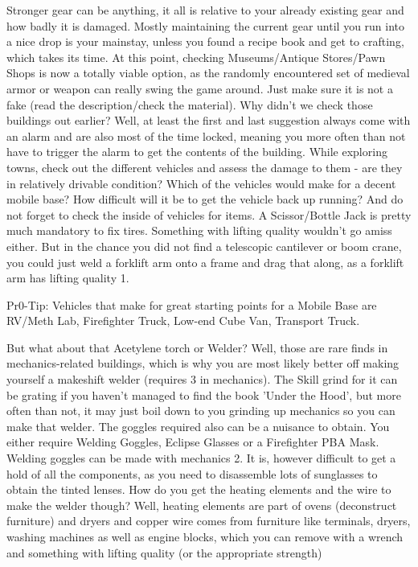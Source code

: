 \documentclass[11pt]{report}
\begin{document}
Stronger gear can be anything, it all is relative to your already existing gear and how badly it is damaged. Mostly maintaining the current gear until you run into a nice drop is your mainstay, unless you found a recipe book and get to crafting, which takes its time. At this point, checking Museums/Antique Stores/Pawn Shops is now a totally viable option, as the randomly encountered set of medieval armor or weapon can really swing the game around. Just make sure it is not a fake (read the description/check the material). Why didn't we check those buildings out earlier? Well, at least the first and last suggestion always come with an alarm and are also most of the time locked, meaning you more often than not have to trigger the alarm to get the contents of the building.
While exploring towns, check out the different vehicles and assess the damage to them - are they in relatively drivable condition? Which of the vehicles would make for a decent mobile base? How difficult will it be to get the vehicle back up running? And do not forget to check the inside of vehicles for items. A Scissor/Bottle Jack is pretty much mandatory to fix tires. Something with lifting quality wouldn't go amiss either. But in the chance you did not find a telescopic cantilever or boom crane, you could just weld a forklift arm onto a frame and drag that along, as a forklift arm has lifting quality 1.

Pr0-Tip: Vehicles that make for great starting points for a Mobile Base are RV/Meth Lab, Firefighter Truck, Low-end Cube Van, Transport Truck.

But what about that Acetylene torch or Welder? Well, those are rare finds in mechanics-related buildings, which is why you are most likely better off making yourself a makeshift welder (requires 3 in mechanics). The Skill grind for it can be grating if you haven't managed to find the book 'Under the Hood', but more often than not, it may just boil down to you grinding up mechanics so you can make that welder. The goggles required also can be a nuisance to obtain. You either require Welding Goggles, Eclipse Glasses or a Firefighter PBA Mask.
Welding goggles can be made with mechanics 2. It is, however difficult to get a hold of all the components, as you need to disassemble lots of sunglasses to obtain the tinted lenses. How do you get the heating elements and the wire to make the welder though? Well, heating elements are part of ovens (deconstruct furniture) and dryers and copper wire comes from furniture like terminals, dryers, washing machines as well as engine blocks, which you can remove with a wrench and something with lifting quality (or the appropriate strength)
\end{document}
